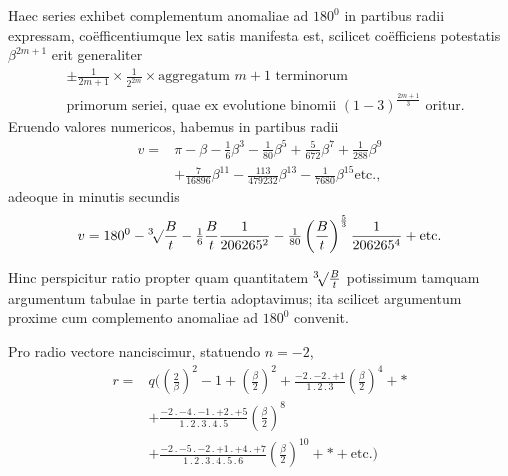 \par
Haec series exhibet complementum anomaliae ad \(180^0\) in partibus radii expressam, coëfficentiumque lex satis manifesta est, scilicet coëfficiens potestatis \(\beta^{2m+1}\) erit generaliter
\[
\begin{aligned}
&\pm\frac{1}{2m+1}\times\frac{1}{2^{2m}}\times\text{aggregatum }m+1\text{ terminorum}\\
&\text{primorum seriei, quae ex evolutione binomii }(1-3)^{\frac{2m+1}{3}}\text{ oritur.}
\end{aligned}
\]
Eruendo valores numericos, habemus in partibus radii
\[
\begin{aligned}
v={}&\pi-\beta-\tfrac16\beta^3-\tfrac1{80}\beta^5+\tfrac5{672}\beta^7+\tfrac1{288}\beta^9\\
&+\tfrac7{16896}\beta^{11}-\tfrac{113}{479232}\beta^{13}-\tfrac1{7680}\beta^{15}\text{etc.,}
\end{aligned}
\]
adeoque in minutis secundis
\[
v=180^0-\BareRoot[3]{\frac{B}{t}}-\tfrac16\frac{B}{t}\frac1{206265^2}
-\tfrac1{80}\left(\frac{B}{t}\right)^{\frac53}\frac1{206265^4}+\text{etc.}
\]
\par
Hinc perspicitur ratio propter quam quantitatem \(\BareRoot[3]{\frac{B}{t}}\) potissimum tamquam argumentum tabulae in parte tertia adoptavimus; ita scilicet argumentum proxime cum complemento anomaliae ad \(180^0\) convenit.
\par
Pro radio vectore nanciscimur, statuendo \(n=-2\),
\[
\begin{aligned}
r={}&q\Biggl(\left(\frac2\beta\right)^2-1+\left(\frac\beta2\right)^2
+\frac{-2\mathpunct{.}-2\mathpunct{.}+1}{1\mathpunct{.}2\mathpunct{.}3}\left(\frac\beta2\right)^4+\ast\\
&+\frac{-2\mathpunct{.}-4\mathpunct{.}-1\mathpunct{.}+2\mathpunct{.}+5}{1\mathpunct{.}2\mathpunct{.}3\mathpunct{.}4\mathpunct{.}5}\left(\frac\beta2\right)^8\\
&+\frac{-2\mathpunct{.}-5\mathpunct{.}-2\mathpunct{.}+1\mathpunct{.}+4\mathpunct{.}+7}{1\mathpunct{.}2\mathpunct{.}3\mathpunct{.}4\mathpunct{.}5\mathpunct{.}6}\left(\frac\beta2\right)^{10}+\ast+\text{etc.}\Biggr)
\end{aligned}
\]
